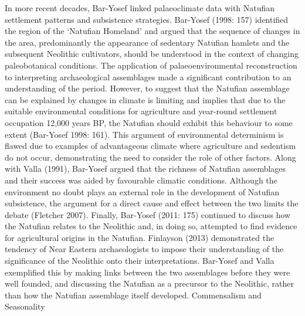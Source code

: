\documentclass[%
	]{ijsra}
\begin{document}
In more recent decades, Bar-Yosef linked palaeoclimate data with Natufian settlement patterns and subsistence strategies. Bar-Yosef (1998: 157) identified the region of the ‘Natufian Homeland’ and argued that the sequence of changes in the area, predominantly the appearance of sedentary Natufian hamlets and the subsequent Neolithic cultivators, should be understood in the context of changing paleobotanical conditions. The application of palaeoenvironmental reconstruction to interpreting archaeological assemblages made a significant contribution to an understanding of the period. However, to suggest that the Natufian assemblage can be explained by changes in climate is limiting and implies that due to the suitable environmental conditions for agriculture and year-round settlement occupation 12,000 years BP, the Natufian should exhibit this behaviour to some extent (Bar-Yosef 1998: 161). This argument of environmental determinism is flawed due to examples of advantageous climate where agriculture and sedentism do not occur, demonstrating the need to consider the role of other factors. Along with Valla (1991), Bar-Yosef argued that the richness of Natufian assemblages and their success was aided by favourable climatic conditions. Although the environment no doubt plays an external role in the development of Natufian subsistence, the argument for a direct cause and effect between the two limits the debate (Fletcher 2007). Finally, Bar-Yosef (2011: 175) continued to discuss how the Natufian relates to the Neolithic and, in doing so, attempted to find evidence for agricultural origins in the Natufian. Finlayson (2013) demonstrated the tendency of Near Eastern archaeologists to impose their understanding of the significance of the Neolithic onto their interpretations. Bar-Yosef and Valla exemplified this by making links between the two assemblages before they were well founded, and discussing the Natufian as a precursor to the Neolithic, rather than how the Natufian assemblage itself developed. 
Commensalism and Seasonality
\end{document}
